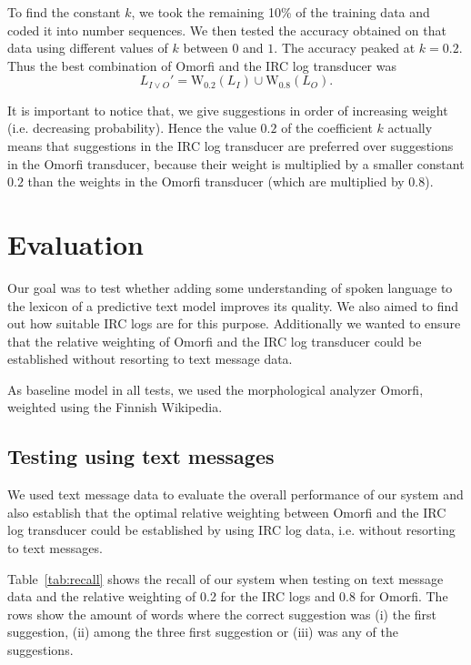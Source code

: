 \documentclass[a4paper,conference]{IEEEtran}
\begin{document}
To find the constant $k$, we took the remaining 10\% of the training
data and coded it into number sequences. We then tested the accuracy
obtained on that data using different values of $k$ between $0$ and
$1$. The accuracy peaked at $k = 0.2$. Thus the best combination of Omorfi and the IRC log transducer was
\begin{equation}L_{I\vee O}' = \mathrm{W}_{0.2}(L_I) \cup \mathrm{W}_{0.8}(L_O)\text{.}\end{equation}

It is important to notice that, we give suggestions in order of
increasing weight (i.e. decreasing probability). Hence the value $0.2$
of the coefficient $k$ actually means that suggestions in the IRC log
transducer are preferred over suggestions in the Omorfi transducer,
because their weight is multiplied by a smaller constant $0.2$ than
the weights in the Omorfi transducer (which are multiplied by $0.8$).

\section{Evaluation}
\label{sec:evaluation}

Our goal was to test whether adding some understanding of spoken
language to the lexicon of a predictive text model improves its
quality. We also aimed to find out how suitable IRC logs are for this
purpose. Additionally we wanted to ensure that the relative weighting
of Omorfi and the IRC log transducer could be established without
resorting to text message data. 

As baseline model in all tests, we used the morphological analyzer
Omorfi, weighted using the Finnish Wikipedia.


\subsection{Testing using text messages}
 
We used text message data to evaluate the overall performance of our
system and also establish that the optimal relative weighting between
Omorfi and the IRC log transducer could be established by using IRC
log data, i.e. without resorting to text messages.

Table~\ref{tab:recall} shows the recall of our system when testing on
text message data and the relative weighting of 0.2 for the IRC logs
and 0.8 for Omorfi. The rows show the amount of words where the
correct suggestion was (i) the first suggestion, (ii) among the three
first suggestion or (iii) was any of the suggestions.
\end{document}
